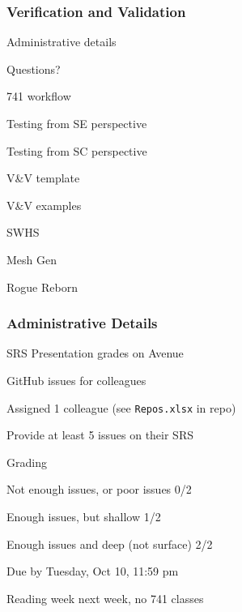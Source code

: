 \documentclass[t,12pt,numbers,fleqn]{beamer}
\begin{document}



\begin{frame}
\frametitle{Verification and Validation}

\bi
\item Administrative details
\item Questions?
\item 741 workflow
\item Testing from SE perspective
\item Testing from SC perspective
\item V\&V template
\item V\&V examples
\bi
\item SWHS
\item Mesh Gen
\item Rogue Reborn
\ei
\ei
\end{frame}


\begin{frame}
\frametitle{Administrative Details}

\bi
\item SRS Presentation grades on Avenue
\item GitHub issues for colleagues
\bi
\item Assigned 1 colleague (see \texttt{Repos.xlsx} in repo)
\item Provide at least 5 issues on their SRS
\item Grading
\bi
\item Not enough issues, or poor issues 0/2
\item Enough issues, but shallow 1/2
\item Enough issues and deep (not surface) 2/2
\ei
\item Due by Tuesday, Oct 10, 11:59 pm
\ei
\item Reading week next week, no 741 classes
\ei

\end{frame}

\end{document}
